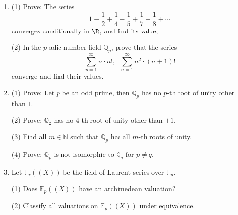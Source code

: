 \begin{enumerate}
\item

(1) Prove: The series $$1 - \frac12 + \frac14 -\frac15 + \frac17 -\frac18 + \cdots $$ 
converges conditionally in $\R$, and find its value;

(2) In the $p$-adic number field $\mathbb{Q}_p$, prove that the series
$$\sum_{n=1}^{\infty} n \cdot n!, \ \ \ \sum_{n=1}^{\infty} n^2 \cdot (n+1)!$$
converge and find their values.

\item

(1) Prove: Let $p$ be an odd prime, then $\mathbb{Q}_p$ has no $p$-th root of unity other than $1$.

(2) Prove: $\mathbb{Q}_2$ has no $4$-th root of unity other than $\pm 1$.

(3) Find all $m\in \mathbb{N}$ such that $\mathbb{Q}_p$ has all $m$-th roots of unity.

(4) Prove: $\mathbb{Q}_p$ is not isomorphic to $\mathbb{Q}_q$ for $p\neq q$. 

\item Let $\mathbb{F}_p((X))$ be the field of Laurent series over $\mathbb{F}_p$.

(1) Does $\mathbb{F}_p((X))$ have an archimedean valuation?

(2) Classify all valuations on $\mathbb{F}_p((X))$ under equivalence.
\end{enumerate}